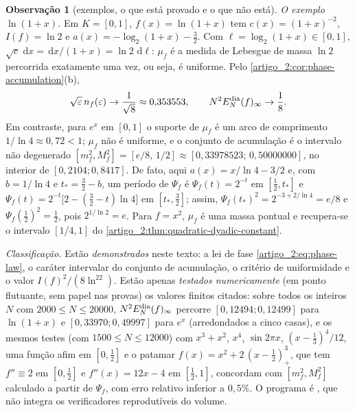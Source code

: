 \documentclass[12pt,a4paper]{article}
\theoremstyle{preciso}
\theoremstyle{definition}
\newcommand{\dd}{\,\mathrm{d}}
\theoremstyle{preciso}
\theoremstyle{preciso}
\theoremstyle{preciso}
\theoremstyle{preciso}
\theoremstyle{definition}
\theoremstyle{preciso}
\theoremstyle{definition}
\newtheorem{remark}[teorema]{Observação}
\theoremstyle{preciso}
\theoremstyle{preciso}
\theoremstyle{definition}
\begin{document}
\begin{remark}[exemplos, o que está provado e o que não está]\label{map:artigo_2:12.9}
\label{artigo_2:rem:phase-examples}
\emph{O exemplo $\ln(1+x)$.} Em $K=[0,1]$, $f(x)=\ln(1+x)$ tem
$c(x)=(1+x)^{-2}$, $I(f)=\ln2$ e $a(x)=-\log_2(1+x)-\tfrac32$. Com
$\ell=\log_2(1+x)\in[0,1]$, $\sqrt{c}\,\dd x=\dd x/(1+x)=\ln2\,\dd\ell$:
$\mu_f$ é a medida de Lebesgue de massa $\ln2$ percorrida exatamente uma vez,
ou seja, é uniforme. Pelo \cref{artigo_2:cor:phase-accumulation}(b),
\[
 \sqrt\varepsilon\,n_f(\varepsilon)\to\frac1{\sqrt8}\approx0{,}353553,
 \qquad
 N^2E_N^{\rm dia}(f)_\infty\to\frac18 .
\]
Em contraste, para $e^x$ em $[0,1]$ o suporte de $\mu_f$ é um arco de
comprimento $1/\ln4\approx0{,}72<1$; $\mu_f$ não é uniforme, e o conjunto de
acumulação é o intervalo não degenerado $[m_f^2,M_f^2]=[e/8,\,1/2]\approx[0{,}33978523;\,0{,}50000000]$,
no interior de $[0{,}2104;0{,}8417]$. De fato, aqui $a(x)=x/\ln4-3/2$ e, com
$b=1/\ln4$ e $t_*=\tfrac32-b$, um período de $\Psi_f$ é
$\Psi_f(t)=2^{-t}$ em $[\tfrac12,t_*]$ e
$\Psi_f(t)=2^{-t}\bigl[2-(\tfrac32-t)\ln4\bigr]$ em $[t_*,\tfrac32]$; assim,
$\Psi_f(t_*)^2=2^{-3+2/\ln4}=e/8$ e $\Psi_f(\tfrac12)^2=\tfrac12$, pois $2^{1/\ln2}=e$.
Para $f=x^2$, $\mu_f$ é uma massa pontual e recupera-se o intervalo $[1/4,1]$ do
\cref{artigo_2:thm:quadratic-dyadic-constant}.

\emph{Classificação.} Estão \emph{demonstrados} neste texto: a lei de fase
\eqref{artigo_2:eq:phase-law}, o caráter intervalar do conjunto de acumulação, o
critério de uniformidade e o valor $I(f)^2/(8\ln^22)$. Estão apenas
\emph{testados numericamente} (em ponto flutuante, sem papel nas provas) os
valores finitos citados: sobre todos os inteiros $N$ com $2000\le N\le20000$,
$N^2E_N^{\rm dia}(f)_\infty$ percorre $[0{,}12494;0{,}12499]$ para $\ln(1+x)$ e
$[0{,}33970;0{,}49997]$ para $e^x$ (arredondados a cinco casas), e os mesmos testes (com $1500\le N\le12000$) com $x^3+x^2$, $x^4$, $\sin2\pi x$, $(x-\tfrac13)^4/12$,
uma função afim em $[0,\tfrac12]$ e o patamar $f(x)=x^2+2\,(x-\tfrac12)_+^3$,
que tem $f''\equiv2$ em $[0,\tfrac12]$ e $f''(x)=12x-4$ em $[\tfrac12,1]$, concordam
com $[m_f^2,M_f^2]$ calculado a partir de $\Psi_f$, com erro relativo inferior a $0{,}5\%$.
O programa é , que não integra os
verificadores reprodutíveis do volume.


\end{remark}
\end{document}
